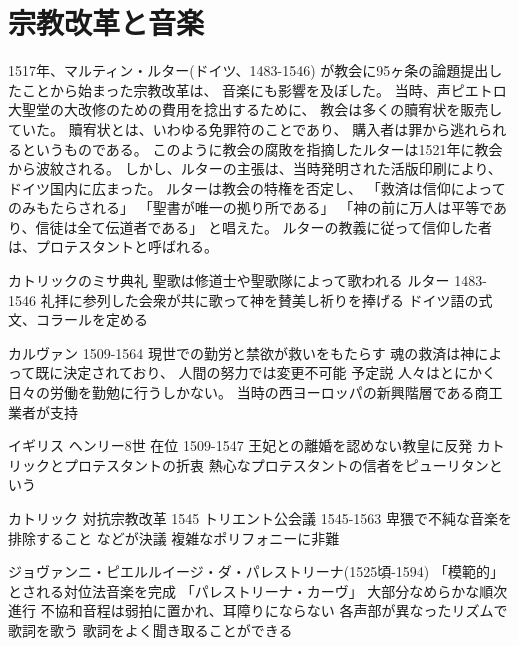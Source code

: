 \documentclass[a4j]{jarticle}
\begin{document}
\section{宗教改革と音楽}

1517年、マルティン・ルター(ドイツ、1483-1546)
が教会に95ヶ条の論題提出したことから始まった宗教改革は、
音楽にも影響を及ぼした。
当時、声ピエトロ大聖堂の大改修のための費用を捻出するために、
教会は多くの贖宥状を販売していた。
贖宥状とは、いわゆる免罪符のことであり、
購入者は罪から逃れられるというものである。
このように教会の腐敗を指摘したルターは1521年に教会から波紋される。
しかし、ルターの主張は、当時発明された活版印刷により、
ドイツ国内に広まった。
ルターは教会の特権を否定し、
「救済は信仰によってのみもたらされる」
「聖書が唯一の拠り所である」
「神の前に万人は平等であり、信徒は全て伝道者である」
と唱えた。
ルターの教義に従って信仰した者は、プロテスタントと呼ばれる。

カトリックのミサ典礼
聖歌は修道士や聖歌隊によって歌われる
ルター 1483-1546
礼拝に参列した会衆が共に歌って神を賛美し祈りを捧げる
ドイツ語の式文、コラールを定める

カルヴァン 1509-1564
現世での勤労と禁欲が救いをもたらす
魂の救済は神によって既に決定されており、
人間の努力では変更不可能
予定説
人々はとにかく日々の労働を勤勉に行うしかない。
当時の西ヨーロッパの新興階層である商工業者が支持

イギリス
ヘンリー8世 在位 1509-1547
王妃との離婚を認めない教皇に反発
カトリックとプロテスタントの折衷
熱心なプロテスタントの信者をピューリタンという

カトリック
対抗宗教改革
1545
トリエント公会議 1545-1563
卑猥で不純な音楽を排除すること
などが決議
複雑なポリフォニーに非難

ジョヴァンニ・ピエルルイージ・ダ・パレストリーナ(1525頃-1594)
「模範的」とされる対位法音楽を完成
「パレストリーナ・カーヴ」
大部分なめらかな順次進行
不協和音程は弱拍に置かれ、耳障りにならない
各声部が異なったリズムで歌詞を歌う
歌詞をよく聞き取ることができる
\end{document}
